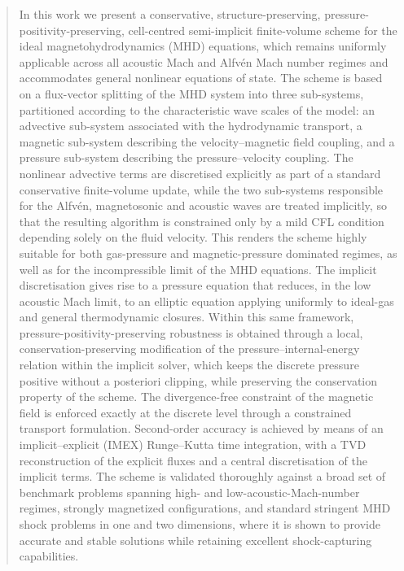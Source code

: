 \documentclass[a4paper,fleqn]{cas-sc}
\theoremstyle{definition}
\theoremstyle{remark}
\begin{document}
\begin{abstract}
In this work we present a conservative, structure-preserving, pressure-positivity-preserving, cell-centred semi-implicit finite-volume scheme for the ideal magnetohydrodynamics (MHD) equations, which remains uniformly applicable across all acoustic Mach and Alfvén Mach number regimes and accommodates general nonlinear equations of state. The scheme is based on a flux-vector splitting of the MHD system into three sub-systems, partitioned according to the characteristic wave scales of the model: an advective sub-system associated with the hydrodynamic transport, a magnetic sub-system describing the velocity–magnetic field coupling, and a pressure sub-system describing the pressure–velocity coupling. The nonlinear advective terms are discretised explicitly as part of a standard conservative finite-volume update, while the two sub-systems responsible for the Alfvén, magnetosonic and acoustic waves are treated implicitly, so that the resulting algorithm is constrained only by a mild CFL condition depending solely on the fluid velocity. This renders the scheme highly suitable for both gas-pressure and magnetic-pressure dominated regimes, as well as for the incompressible limit of the MHD equations. The implicit discretisation gives rise to a pressure equation that reduces, in the low acoustic Mach limit, to an elliptic equation applying uniformly to ideal-gas and general thermodynamic closures. Within this same framework, pressure-positivity-preserving robustness is obtained through a local, conservation-preserving modification of the pressure–internal-energy relation within the implicit solver, which keeps the discrete pressure positive without a posteriori clipping, while preserving the conservation property of the scheme. The divergence-free constraint of the magnetic field is enforced exactly at the discrete level through a constrained transport formulation. Second-order accuracy is achieved by means of an implicit--explicit (IMEX)
Runge--Kutta time integration, with a TVD reconstruction of the explicit fluxes and
a central discretisation of the implicit terms. The scheme is validated thoroughly against a broad set of benchmark problems spanning high- and low-acoustic-Mach-number regimes, strongly magnetized configurations, and standard stringent MHD shock problems in one and two dimensions, where it is shown to provide accurate and stable solutions while retaining excellent shock-capturing capabilities.
\end{abstract}
\end{document}
